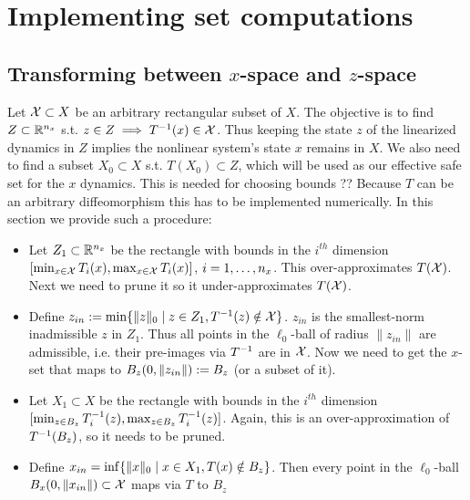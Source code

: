 \section{Implementing set computations}
\label{sec:implementing set computations}

\subsection{Transforming between $x$-space and $z$-space}
\label{sec:transforming x to z}
Let $\mathcal{X} \subset X$ be an arbitrary rectangular subset of $X$. 
The objective is to find $Z \subset \mathbb{R}^{n_x}$ s.t. $z \in  Z \implies T^{-1}(x) \in \mathcal{X}$. 
Thus keeping the state $z$ of the linearized dynamics in $Z$ implies the nonlinear system's state $x$ remains in $X$.
We also need to find a subset $X_0 \subset X$ s.t. $T(X_0) \subset Z$, which will be used as our effective safe set for the $x$ dynamics.
This is needed for choosing bounds ??
Because $T$ can be an arbitrary diffeomorphism this has to be implemented numerically.
In this section we provide such a procedure:
\begin{itemize}
	\item Let $Z_1 \subset \mathbb{R}^{n_x}$ be the rectangle with bounds in the $i^{th}$ dimension $[ \min_{x \in \mathcal{X}} T_i(x),  \max_{x \in \mathcal{X}} T_i(x) ]$, $i=1,\ldots, n_x$.
	This over-approximates $T(\mathcal{X})$. 
	Next we need to prune it so it under-approximates $T(\mathcal{X})$. 
	\item Define $z_{in} := \min \{ \|z \|_0 \;|\; z \in Z_1, T^{-1}(z) \notin \mathcal{X}\}$.
	$z_{in}$ is the smallest-norm inadmissible $z$ in $Z_1$.
	Thus all points in the $\ell_0$-ball of radius $\|z_{in}\|$ are admissible, i.e. their pre-images via $T^{-1}$ are in $\mathcal{X}$.
	Now we need to get the $x$-set that maps to $B_z(0,\|z_{in}\|) := B_{z}$  (or a subset of it).
	\item Let $X_1 \subset X$ be the rectangle with bounds in the $i^{th}$ dimension $[\min_{z \in B_{z}} T^{-1}_i(z),  \max_{z \in B_{z}} T^{-1}_i(z) ]$.
	Again, this is an over-approximation of $T^{-1}(B_{z})$, so it needs to be pruned.
	\item Define $x_{in} = \inf \{\|x\|_0 \;|\; x \in X_1, T(x) \notin B_{z}\}$.
	Then every point in the $\ell_0$-ball $B_x(0, \|x_{in}\|) \subset \mathcal{X}$ maps via $T$ to $B_{z}$
\end{itemize}
